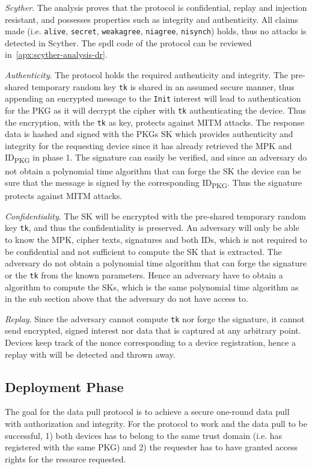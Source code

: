 \textit{Scyther}.
The analysis proves that the protocol is confidential, replay and injection resistant, and possesses properties such as integrity and authenticity.
All claims made (i.e. \texttt{alive}, \texttt{secret}, \texttt{weakagree}, \texttt{niagree}, \texttt{nisynch}) holds, thus no attacks is detected in Scyther.
The \gls{spdl} code of the protocol can be reviewed in~\autoref{apx:scyther-analysis-dr}.

\textit{Authenticity}.
The protocol holds the required authenticity and integrity. 
The pre-shared temporary random key \texttt{tk} is shared in an assumed secure manner, thus appending an encrypted message to the \texttt{Init} \gls{interest} will lead to authentication for the \gls{PKG} as it will decrypt the cipher with \texttt{tk} authenticating the device.
Thus the encryption, with the \texttt{tk} as key, protects against \gls{MITM} attacks.
The response \gls{data} is hashed and signed with the \gls{PKG}s \gls{SK} which provides authenticity and integrity for the requesting device since it has already retrieved the \gls{MPK} and ID\textsubscript{PKG} in phase 1.
The signature can easily be verified, and since an adversary do not obtain a polynomial time algorithm that can forge the \gls{SK} the device can be sure that the message is signed by the corresponding ID\textsubscript{PKG}.
Thus the signature protects against \gls{MITM} attacks.

\textit{Confidentiality}. 
The \gls{SK} will be encrypted with the pre-shared temporary random key \texttt{tk}, and thus the confidentiality is preserved.
An adversary will only be able to know the \gls{MPK}, cipher texts, signatures and both IDs, which is not required to be confidential and not sufficient to compute the \gls{SK} that is extracted. 
The adversary do not obtain a polynomial time algorithm that can forge the signature or the \texttt{tk} from the known parameters.
Hence an adversary have to obtain a algorithm to compute the \gls{SK}s, which is the same polynomial time algorithm as in the sub section above that the adversary do not have access to.

\textit{Replay}.
Since the adversary cannot compute \texttt{tk} nor forge the signature, it cannot send encrypted, signed \gls{interest} nor \gls{data} that is captured at any arbitrary point. 
Devices keep track of the nonce corresponding to a device registration, hence a replay with will be detected and thrown away.

\subsection{Deployment Phase}\label{data_pull}
The goal for the data pull protocol is to achieve a secure one-round data pull with authorization and integrity.
For the protocol to work and the data pull to be successful, 1) both devices has to belong to the same trust domain (i.e. has registered with the same \gls{PKG}) and 2) the requester has to have granted access rights for the resource requested.

